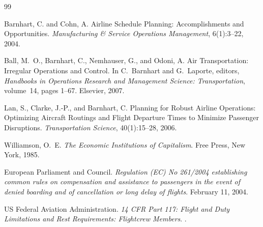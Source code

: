 \documentclass[11pt,a4paper]{article}
\theoremstyle{definition}
\theoremstyle{remark}
\begin{document}
\begin{thebibliography}{99}

Barnhart, C. and Cohn, A.
\newblock Airline Schedule Planning: Accomplishments and Opportunities.
\newblock \emph{Manufacturing \& Service Operations Management},
  6(1):3--22, 2004.

Ball, M.~O., Barnhart, C., Nemhauser, G., and Odoni, A.
\newblock Air Transportation: Irregular Operations and Control.
\newblock In C.~Barnhart and G.~Laporte, editors, \emph{Handbooks in
  Operations Research and Management Science: Transportation},
  volume~14, pages 1--67. Elsevier, 2007.

Lan, S., Clarke, J.-P., and Barnhart, C.
\newblock Planning for Robust Airline Operations: Optimizing Aircraft
  Routings and Flight Departure Times to Minimize Passenger Disruptions.
\newblock \emph{Transportation Science}, 40(1):15--28, 2006.

Williamson, O.~E.
\newblock \emph{The Economic Institutions of Capitalism}.
\newblock Free Press, New York, 1985.

European Parliament and Council.
\newblock \emph{Regulation (EC) No 261/2004 establishing common rules
  on compensation and assistance to passengers in the event of denied
  boarding and of cancellation or long delay of flights}.
\newblock February 11, 2004.

US Federal Aviation Administration.
\newblock \emph{14 CFR Part 117: Flight and Duty Limitations and Rest
  Requirements: Flightcrew Members}.
.

\end{thebibliography}
\end{document}
